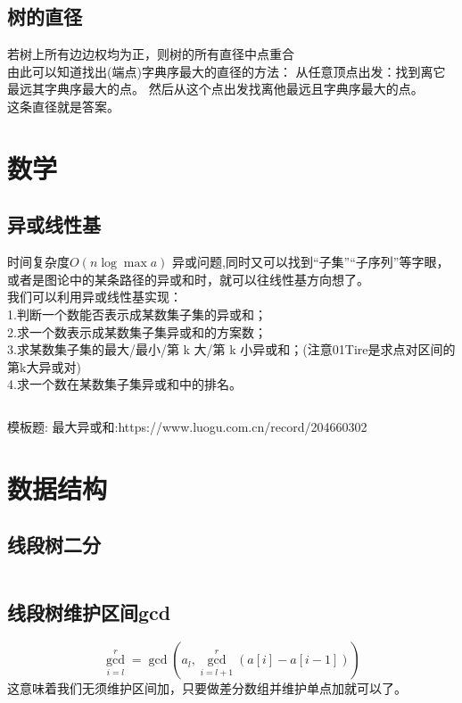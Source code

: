 \documentclass[a4paper]{report}
\newcommand{\cppcode}[1]{  
    \inputminted[mathescape]{cpp}{source/#1}  
}
\begin{document}
\section{树的直径}
若树上所有边边权均为正，则树的所有直径中点重合\\
由此可以知道找出(端点)字典序最大的直径的方法：
从任意顶点出发：找到离它最远其字典序最大的点。
然后从这个点出发找离他最远且字典序最大的点。\\
这条直径就是答案。

\chapter{数学}

\section{异或线性基}
时间复杂度$O(n\log{\max{a}})$
异或问题,同时又可以找到“子集”“子序列”等字眼，或者是图论中的某条路径的异或和时，就可以往线性基方向想了。\\
我们可以利用异或线性基实现：\\
1.判断一个数能否表示成某数集子集的异或和；\\
2.求一个数表示成某数集子集异或和的方案数；\\
3.求某数集子集的最大/最小/第 k 大/第 k 小异或和；(注意01Tire是求点对区间的第k大异或对) \\
4.求一个数在某数集子集异或和中的排名。\\
\cppcode{basis.cpp}
模板题:
最大异或和:https://www.luogu.com.cn/record/204660302


\chapter{数据结构}
\section{线段树二分}
\cppcode{segment_tree.cpp}
\section{线段树维护区间gcd}
$$
\gcd_{i=l}^{r}=\gcd(a_l,\gcd_{i=l+1}^{r}(a[i]-a[i-1]))
$$
这意味着我们无须维护区间加，只要做差分数组并维护单点加就可以了。\\
\cppcode{segtgcd.cpp}
\end{document}
